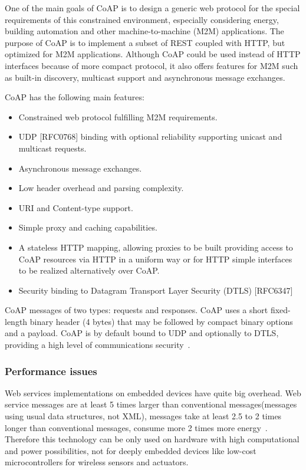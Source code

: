    One of the main goals of CoAP is to design a generic web protocol for
   the special requirements of this constrained environment, especially
   considering energy, building automation and other machine-to-machine
   (M2M) applications.  The purpose of CoAP is to implement a subset of REST
   coupled with HTTP, but optimized for M2M applications.  Although CoAP could
   be used instead of HTTP interfaces because of more compact protocol, it
   also offers features for M2M such as built-in discovery, multicast support and asynchronous message
   exchanges.
      
     CoAP has the following main features:
\begin{itemize}
  \item Constrained web protocol fulfilling M2M requirements.
  \item UDP [RFC0768] binding with optional reliability supporting unicast
      and multicast requests.
  \item Asynchronous message exchanges.
  \item Low header overhead and parsing complexity.
  \item URI and Content-type support.
  \item Simple proxy and caching capabilities.
  \item A stateless HTTP mapping, allowing proxies to be built providing
      access to CoAP resources via HTTP in a uniform way or for HTTP
      simple interfaces to be realized alternatively over CoAP.
  \item Security binding to Datagram Transport Layer Security (DTLS)
      [RFC6347]
\end{itemize}
   
CoAP messages  of two types: requests and responses. 
CoAP uses a short fixed-length binary header (4 bytes) that may be
followed by compact binary options and a payload.
CoAP is by default bound to UDP and optionally to DTLS, providing a high level
of communications security~\cite{wikipedia:coap}.

\subsubsection{Performance issues}

Web services implementations on embedded
devices have quite big overhead. Web service messages are at least 5 times
larger than conventional messages(messages using usual data structures, not XML),
messages take at least 2.5 to 2 times longer than conventional
messages, consume more 2 times more energy~\cite{5470528}.
Therefore this technology can be only used on hardware with high computational and power
possibilities, not for deeply embedded devices like low-cost microcontrollers for wireless sensors and actuators. 

